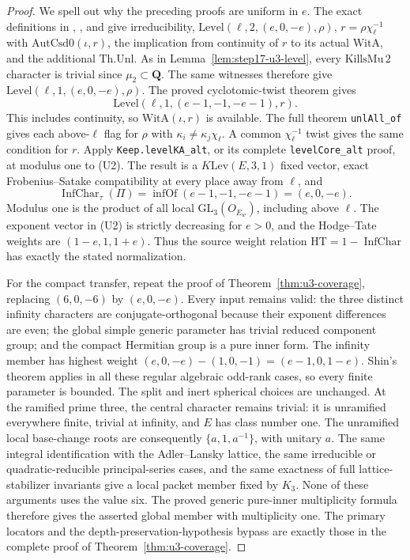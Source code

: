 \documentclass[11pt,a4paper]{article}
\theoremstyle{definition}
\begin{document}
\begin{proof}
We spell out why the preceding proofs are uniform in $e$.
The exact definitions in ,
, and  give
irreducibility, $\mathrm{Level}(\ell,2,(e,0,-e),\rho)$,
$r=\rho\chi_\ell^{-1}$ with $\mathrm{AutCsd0}(\iota,r)$, the implication
from continuity of $r$ to its actual $\mathrm{WitA}$, and the additional
$\mathrm{Th.Unl}$.
As in Lemma~\ref{lem:step17-u3-level}, every
$\mathrm{KillsMu}\,2$ character is trivial since $\mu_2\subset\mathbf Q$.
The same witnesses therefore give
$\mathrm{Level}(\ell,1,(e,0,-e),\rho)$.
The proved cyclotomic-twist theorem gives
\[
 \mathrm{Level}(\ell,1,(e-1,-1,-e-1),r).
 \tag{U2}
\]
This includes continuity, so $\mathrm{WitA}(\iota,r)$ is available.
The full theorem \texttt{unlAll\_of} gives each above-$\ell$ flag for
$\rho$ with $\kappa_i\ne\kappa_j\chi_\ell$. A common
$\chi_\ell^{-1}$ twist gives the same condition for $r$.
Apply \texttt{Keep.levelKA\_alt}, or its complete
\texttt{levelCore\_alt} proof, at modulus one to (U2).
The result is a $K\mathrm{Lev}(E,3,1)$ fixed vector, exact
Frobenius--Satake compatibility at every place away from $\ell$, and
\[
 \operatorname{InfChar}_\tau(\Pi)
 =\operatorname{infOf}(e-1,-1,-e-1)=(e,0,-e).
 \tag{U3}
\]
Modulus one is the product of all local
$\mathrm{GL}_3(O_{E_w})$, including above $\ell$.
The exponent vector in (U2) is strictly decreasing for $e>0$,
and the Hodge--Tate weights are $(1-e,1,1+e)$.
Thus the source weight relation
$\mathrm{HT}=1-\operatorname{InfChar}$ has exactly the stated
normalization.

For the compact transfer, repeat the proof of
Theorem~\ref{thm:u3-coverage}, replacing $(6,0,-6)$ by $(e,0,-e)$.
Every input remains valid: the three distinct infinity characters are
conjugate-orthogonal because their exponent differences are even; the
global simple generic parameter has trivial reduced component group;
and the compact Hermitian group is a pure inner form.
The infinity member has highest weight
$(e,0,-e)-(1,0,-1)=(e-1,0,1-e)$.
Shin's theorem applies in all these regular algebraic odd-rank cases,
so every finite parameter is bounded.
The split and inert spherical choices are unchanged.
At the ramified prime three, the central character remains trivial:
it is unramified everywhere finite, trivial at infinity, and $E$ has
class number one.
The unramified local base-change roots are consequently
$\{a,1,a^{-1}\}$, with unitary $a$.
The same integral identification with the Adler--Lansky lattice, the
same irreducible or quadratic-reducible principal-series cases, and
the same exactness of full lattice-stabilizer invariants give a local
packet member fixed by $K_3$. None of these arguments uses the value
six. The proved generic pure-inner multiplicity formula therefore
gives the asserted global member with multiplicity one.
The primary locators and the depth-preservation-hypothesis bypass are
exactly those in the complete proof of
Theorem~\ref{thm:u3-coverage}.


\end{proof}
\end{document}
